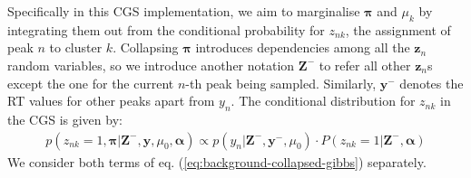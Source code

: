 Specifically in this CGS implementation, we aim to marginalise $\boldsymbol{\pi}$ and $\mu_k$ by integrating them out from the conditional probability for $z_{nk}$, the assignment of peak $n$ to cluster $k$. Collapsing $\boldsymbol{\pi}$ introduces dependencies among all the $\boldsymbol{z}_n$ random variables, so we introduce another notation $\boldsymbol{Z}^{-}$ to refer all other $\boldsymbol{z}_n$s except the one for the current $n$-th peak being sampled. Similarly, $\boldsymbol{y}^{-}$ denotes the RT values for other peaks apart from $y_n$. The conditional distribution for $z_{nk}$ in the CGS is given by:
\begin{equation}
\begin{aligned}
p(z_{nk}=1, \boldsymbol{\pi} \vert \boldsymbol{Z}^{-}, \boldsymbol{y}, \mu_0, \boldsymbol{\alpha}) \propto p(y_n \vert \boldsymbol{Z}^{-},  \boldsymbol{y}^{-}, \mu_0) \cdot P(z_{nk}=1 \vert \boldsymbol{Z}^{-}, \boldsymbol{\alpha})
\end{aligned}
\label{eq:background-collapsed-gibbs}
\end{equation}
We consider both terms of eq. (\ref{eq:background-collapsed-gibbs}) separately. 
